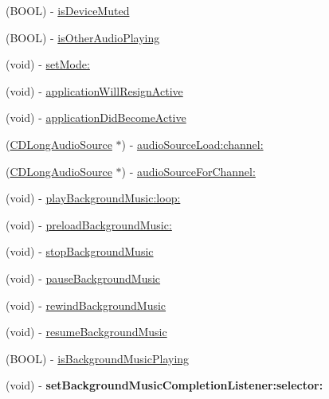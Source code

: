 \begin{DoxyCompactItemize}
\item 
(B\-O\-O\-L) -\/ \hyperlink{interface_c_d_audio_manager_a5a4df8bc83cbc6e6723196d3d4ec4974}{is\-Device\-Muted}
\item 
(B\-O\-O\-L) -\/ \hyperlink{interface_c_d_audio_manager_ab664b34e99f6f3e2158f2df910cf3a95}{is\-Other\-Audio\-Playing}
\item 
(void) -\/ \hyperlink{interface_c_d_audio_manager_a72fd182d62cc75dfa3701da4a5d97346}{set\-Mode\-:}
\item 
(void) -\/ \hyperlink{interface_c_d_audio_manager_a5265cc9a823688a547aa60e8995ba423}{application\-Will\-Resign\-Active}
\item 
(void) -\/ \hyperlink{interface_c_d_audio_manager_aa572c7a296c0b2de3564f8da368835ef}{application\-Did\-Become\-Active}
\item 
(\hyperlink{interface_c_d_long_audio_source}{C\-D\-Long\-Audio\-Source} $\ast$) -\/ \hyperlink{interface_c_d_audio_manager_af1115f9197d62586dd0d16b440570c01}{audio\-Source\-Load\-:channel\-:}
\item 
(\hyperlink{interface_c_d_long_audio_source}{C\-D\-Long\-Audio\-Source} $\ast$) -\/ \hyperlink{interface_c_d_audio_manager_a07c2429b4ae8340c5aefe21c381f102f}{audio\-Source\-For\-Channel\-:}
\item 
(void) -\/ \hyperlink{interface_c_d_audio_manager_a0d7307effb3adbf755b1de16d82e7c45}{play\-Background\-Music\-:loop\-:}
\item 
(void) -\/ \hyperlink{interface_c_d_audio_manager_a613d13a6227a90dd5a073dbde1ac447b}{preload\-Background\-Music\-:}
\item 
(void) -\/ \hyperlink{interface_c_d_audio_manager_a2403abdc32f144a0d57d915db42d35a6}{stop\-Background\-Music}
\item 
(void) -\/ \hyperlink{interface_c_d_audio_manager_acbd505494ec2f01e484dfca635b208b8}{pause\-Background\-Music}
\item 
(void) -\/ \hyperlink{interface_c_d_audio_manager_a98e99a2b9eabcf89ad7419f6f809c65a}{rewind\-Background\-Music}
\item 
(void) -\/ \hyperlink{interface_c_d_audio_manager_a9bcc620677df7b828dd69c951b445062}{resume\-Background\-Music}
\item 
(B\-O\-O\-L) -\/ \hyperlink{interface_c_d_audio_manager_a3b519950dee5dd8e79c8bbbf3c0f7e26}{is\-Background\-Music\-Playing}
\item 
\hypertarget{interface_c_d_audio_manager_a6c3d719386b69c1a5b2d44a83ce4da55}{(void) -\/ {\bfseries set\-Background\-Music\-Completion\-Listener\-:selector\-:}}\label{interface_c_d_audio_manager_a6c3d719386b69c1a5b2d44a83ce4da55}

\end{DoxyCompactItemize}
